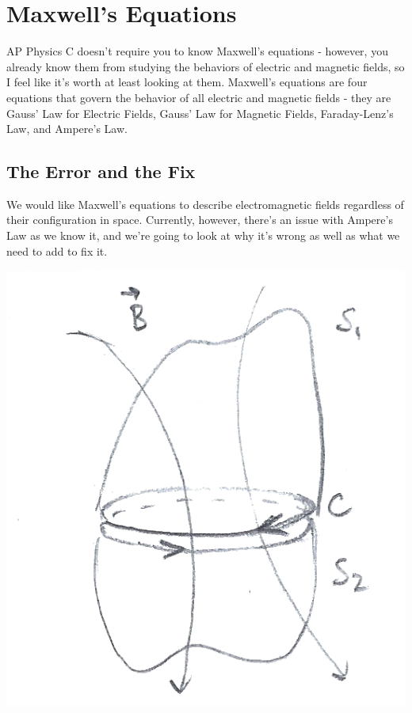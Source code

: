 \section{Maxwell's Equations}
AP Physics C doesn't require you to know Maxwell's equations - however, you already know them from studying the behaviors of electric and magnetic fields, so I feel like it's worth at least looking at them. Maxwell's equations are four equations that govern the behavior of all electric and magnetic fields - they are Gauss' Law for Electric Fields, Gauss' Law for Magnetic Fields, Faraday-Lenz's Law, and Ampere's Law. 
\subsection{The Error and the Fix}
We would like Maxwell's equations to describe electromagnetic fields regardless of their configuration in space. Currently, however, there's an issue with Ampere's Law as we know it, and we're going to look at why it's wrong as well as what we need to add to fix it. \\
\begin{center}
	\includegraphics[scale=0.25]{images/em/faraday-surface.png}
\end{center}
